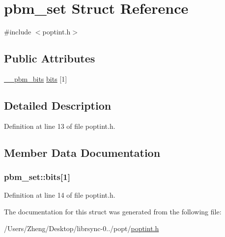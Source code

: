 \hypertarget{structpbm__set}{}\section{pbm\+\_\+set Struct Reference}
\label{structpbm__set}


{\ttfamily \#include $<$poptint.\+h$>$}

\subsection*{Public Attributes}
\begin{DoxyCompactItemize}
\item 
\hyperlink{poptint_8h_a64172439381f4c94ef342d65717dbc96}{\+\_\+\+\_\+pbm\+\_\+bits} \hyperlink{structpbm__set_a968b1c4cd77b8b484d1175019689690e}{bits} \mbox{[}1\mbox{]}
\end{DoxyCompactItemize}


\subsection{Detailed Description}


Definition at line 13 of file poptint.\+h.



\subsection{Member Data Documentation}
\hypertarget{structpbm__set_a968b1c4cd77b8b484d1175019689690e}{}
\subsubsection[{bits}]{ pbm\+\_\+set\+::bits\mbox{[}1\mbox{]}}\label{structpbm__set_a968b1c4cd77b8b484d1175019689690e}


Definition at line 14 of file poptint.\+h.



The documentation for this struct was generated from the following file\+:\begin{DoxyCompactItemize}
\item 
/\+Users/\+Zheng/\+Desktop/librsync-\/0../popt/\hyperlink{poptint_8h}{poptint.\+h}\end{DoxyCompactItemize}
